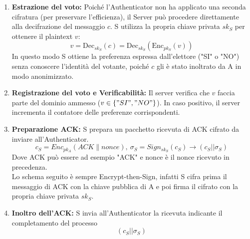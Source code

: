 \begin{enumerate}
			\item \textbf{Estrazione del voto:} Poiché l'Authenticator non ha applicato una seconda cifratura (per preservare l'efficienza), il Server può procedere direttamente alla decifrazione del messaggio $c$. S utilizza la propria chiave privata $sk_S$ per ottenere il plaintext $v$:
			$$ v=\text{Dec}_{sk_S}(c)= \text{Dec}_{sk_S}(\text{Enc}_{pk_S}(v)) $$
			In questo modo S ottiene la preferenza espressa dall'elettore ("SI" o "NO") senza conoscere l'identità del votante, poiché $c$ gli è stato inoltrato da A in modo anonimizzato.
			
			\item \textbf{Registrazione del voto e Verificabilità:} Il server verifica che $v$ faccia parte del dominio ammesso ($v\in\{"SI","NO"\}$). In caso positivo, il server incrementa il contatore delle preferenze corrispondenti.
			
			\item \textbf{Preparazione ACK: } S prepara un pacchetto ricevuta di ACK cifrato da inviare all'Authenticator.
			$$ c_S=Enc_{pk_A}(ACK\|nonce),\ \sigma_S=Sign_{sk_S}(c_S) \to (c_S||\sigma_S) $$
			Dove ACK può essere ad esempio "ACK" e nonce è il nonce ricevuto in precedenza.\\
			Lo schema seguito è sempre Encrypt-then-Sign, infatti S cifra prima il messaggio di ACK con la chiave pubblica di A e poi firma il cifrato con la propria chiave privata $sk_S$.
			
			\item \textbf{Inoltro dell'ACK: } S invia all'Authenticator la ricevuta indicante il completamento del processo
			$$ (c_S||\sigma_S) $$
		\end{enumerate}
		
